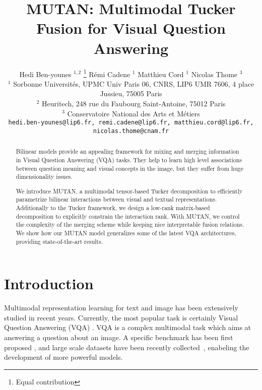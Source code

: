 \documentclass[10pt,twocolumn,letterpaper]{article}
\begin{document}
\title{MUTAN: Multimodal Tucker Fusion for Visual Question Answering}

\author{Hedi Ben-younes $^{1,2}$ \thanks{Equal contribution}
\qquad 
R\'emi Cadene $^1$\footnotemark[1] 
\qquad  
Matthieu Cord $^1$  
\qquad 
Nicolas Thome $^3$ 
\\ $^1$ Sorbonne Universit\'es, UPMC Univ Paris 06, CNRS, LIP6 UMR 7606, 4 place Jussieu, 75005 Paris
\\ $^2$ Heuritech, 248 rue du Faubourg Saint-Antoine, 75012 Paris 
\\ $^3$ Conservatoire National des Arts et M\'etiers
\\  {\tt\small hedi.ben-younes@lip6.fr, remi.cadene@lip6.fr, matthieu.cord@lip6.fr, nicolas.thome@cnam.fr}
}
\maketitle


\vspace{-0.2cm}
\begin{abstract}
Bilinear models provide an appealing framework for mixing and merging information in Visual Question Answering (VQA) tasks.
They help to learn high level associations between question meaning and visual concepts in the image, but they suffer from huge dimensionality issues.  

We introduce MUTAN, a multimodal tensor-based Tucker decomposition to efficiently parametrize bilinear interactions between visual and textual representations. 
Additionally to the Tucker framework, we design a low-rank matrix-based decomposition to explicitly constrain the interaction rank. With MUTAN, we control the complexity of the merging 
scheme while keeping nice interpretable fusion relations. We show how our MUTAN model generalizes some of the latest VQA architectures, providing state-of-the-art results.
\end{abstract}
\vspace{-0.2cm}
\section{Introduction}

Multimodal representation learning for text and image has been extensively studied in recent years. Currently,  the most popular task is certainly Visual Question Answering (VQA) \cite{Malinowski2014, VQA}. VQA is a complex multimodal task which aims at answering a question about an image. 
A specific benchmark has been first proposed \cite{Malinowski2014}, and large scale datasets have been recently collected~\cite{DBLP:conf/nips/RenKZ15,VQA,zhu2016cvpr}, enabeling the development of more powerful models. 
\end{document}
